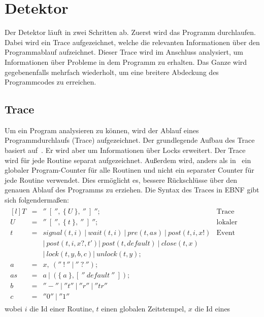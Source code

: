 \chapter{Detektor}\label{chap:TheoDet}
Der Detektor läuft in zwei Schritten ab. Zuerst wird das Programm 
durchlaufen. Dabei wird ein Trace aufgezeichnet, welche die relevanten 
Informationen über den Programmablauf aufzeichnet. Dieser 
Trace wird im Anschluss analysiert, um Informationen über Probleme 
in dem Programm zu erhalten. Das Ganze wird gegebenenfalls mehrfach wiederholt,
um eine breitere Abdeckung des Programmcodes zu erreichen.


\section{Trace}\label{chap:background-sec:trace}
Um ein Program analysieren zu können, wird der Ablauf eines Programmdurchlaufs
(Trace) aufgezeichnet. Der grundlegende Aufbau des Trace basiert auf~\cite{PPDP18}. 
Er wird aber um Informationen 
über Locks erweitert. Der Trace wird für jede Routine
separat aufgezeichnet. Außerdem wird, anders als in~\cite{PPDP18} ein globaler
Program-Counter für alle Routinen und nicht ein separater Counter für jede 
Routine verwendet. Dies ermöglicht es, bessere Rückschlüsse über den genauen 
Ablauf des Programms zu erziehen.
Die Syntax des Traces in EBNF gibt sich 
folgendermaßen:
\begin{align*}
  \begin{matrix*}[l]
    T & = & ''\ [\ '',\ \{\ U\ \},\ ''\ ]\ ''; & \text{Trace}\\
    U & = & ''\ [\ '',\ \{\ t\ \},\ ''\ ]\ ''; & \text{lokaler Trace} \\
    t & = & signal(t, i)\ |\ wait(t, i)\ |\ pre(t, as)\ |\ post(t, i, x!) & \text{Event}\\
      &   & |\ post(t, i, x?, t') |\ post(t, default)\ 
      |\ close(t, x)\  
      & \\
      &   & |\ lock(t, y, b, c) |\ unlock(t, y); & \\
    a & = & x,\ (''\ !\ ''\ |\ ''\ ?\ ''); & \\
    as & = & a\ |\ (\{\ a\ \}, [\ ''\ default\ ''\ ]); & \\
    b & = & ''-''\ |\ ''t''\ |\ ''r''\ |\ ''tr'' & \\
    c & = & ''0''\ |\ ''1''
  \end{matrix*}
\end{align*}
wobei $i$ die Id einer Routine, $t$ einen globalen Zeitstempel, $x$ die Id eines 
